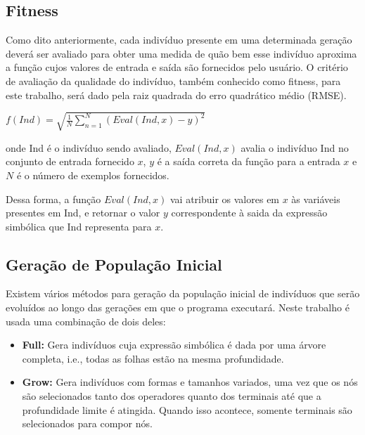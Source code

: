 \documentclass[12pt]{article}
\begin{document}
\subsection{Fitness}

Como dito anteriormente, cada indivíduo presente em uma determinada geração
deverá ser avaliado para obter uma medida de quão bem esse indivíduo aproxima
a função cujos valores de entrada e saída são fornecidos pelo usuário. O critério
de avaliação da qualidade do indivíduo, também conhecido como fitness, para este
trabalho, será dado pela raiz quadrada do erro quadrático médio (RMSE).

\begin{center}
 \begin{math}
  f(Ind) = \sqrt{\frac{1}{N}\sum_{n=1}^{N}(Eval(Ind, x) - y)^2}
  \end{math}
\end{center}

onde Ind é o indivíduo sendo avaliado, $ Eval(Ind, x) $ avalia o indivíduo Ind
no conjunto de entrada fornecido $ x $, $ y $ é a saída correta da função para 
a entrada $ x $ e $ N $ é o número de exemplos fornecidos.

Dessa forma, a função $ Eval(Ind, x) $ vai atribuir os valores em $ x $ às
variáveis presentes em Ind, e retornar o valor $ y $ correspondente à saida
da expressão simbólica que Ind representa para $ x $.

\subsection{Geração de População Inicial}

Existem vários métodos para geração da população inicial de indivíduos que serão
evoluídos ao longo das gerações em que o programa executará. Neste trabalho é usada
uma combinação de dois deles:

\begin{itemize}
 \item \textbf{Full:} Gera indivíduos cuja expressão simbólica é dada por uma árvore
 completa, i.e., todas as folhas estão na mesma profundidade.
 \item \textbf{Grow:} Gera indivíduos com formas e tamanhos variados, uma vez que
 os nós são selecionados tanto dos operadores quanto dos terminais até que a profundidade
 limite é atingida. Quando isso acontece, somente terminais são selecionados para compor
 nós.
\end{itemize}
\end{document}
